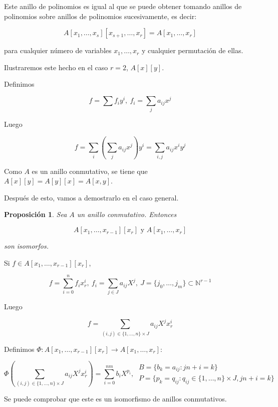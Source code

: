 \documentclass[11pt, a4paper, titlepage]{article}
\makeatletter
\renewenvironment{proof}[1][\proofname] {\vspace{-15pt}\par\pushQED{\qed}\normalfont\topsep6\p@\@plus6\p@\relax\trivlist\item[\hskip\labelsep\it#1\@addpunct{.}]\ignorespaces}{\popQED\endtrivlist\@endpefalse}
\theoremstyle{theorem-style}
\newtheorem*{nprop}{Proposición}
\theoremstyle{definition-style}
\theoremstyle{remark-style}
\theoremstyle{example-style}
\makeatother
\begin{document}
Este anillo de polinomios es igual al que se puede obtener tomando anillos de polinomios sobre anillos de polinomios sucesivamente,
es decir:

\[
    A[x_1, \dots, x_{s}][x_{s+1}, \dots, x_{r}] = A[x_1, \dots, x_r]
\]
    
para cualquier número de variables $x_1, \dots, x_r$ y cualquier permutación de ellas.

Ilustraremos este hecho en el caso $r=2$, $A[x][y]$.

Definimos

\[
f=\sum f_i y^i,\ f_i = \sum_j a_{ij}x^j
\]

Luego

\[
f = \sum_i \left(\sum_j a_{ij}x^j \right)y^i = \sum_{i,j} a_{ij}x^iy^j
\]

Como $A$ es un anillo conmutativo, se tiene que $A[x][y] = A[y][x] = A[x,y]$.

Después de esto, vamos a demostrarlo en el caso general.

\begin{nprop}
  Sea $A$ un anillo conmutativo. Entonces

  \[
     A[x_1, \dots, x_{r-1}][x_r] \text{ y } A[x_1, \dots, x_r]
  \]

   son isomorfos.
\end{nprop}

\begin{proof}
  Si $f \in A[x_1, \dots, x_{r-1}][x_r]$,

  \[
       f = \sum_{i=0}^n f_i x_r^i,\ f_i = \sum_{j\in J} a_{ij} X^j,\ J = \{j_0, \dots, j_m\} \subset \mathbb{N}^{r-1}
  \]

  Luego

  \[
      f = \sum_{(i,j) \in \{1,\dots,n\}\times J} a_{ij}X^j x_r^i
  \]

  Definimos $\Phi : A[x_1, \dots, x_{r-1}][x_r] \to A[x_1, \dots, x_r]$:

  \[
    \Phi \left(\sum_{(i,j) \in \{1,\dots,n\}\times J} a_{ij}X^j x_r^i\right) = \sum_{i=0}^{nm} b_i X^{p_i},\ 
    \begin{array}{l}
      B = \{ b_k = a_{ij} : jn + i = k \} \\
      P = \{ p_k = q_{ij} : q_{ij} \in \{1, \dots, n \} \times J, jn+i = k \}
    \end{array}
  \]

  Se puede comprobar que este es un isomorfismo de anillos conmutativos.
       
\end{proof}
\end{document}
